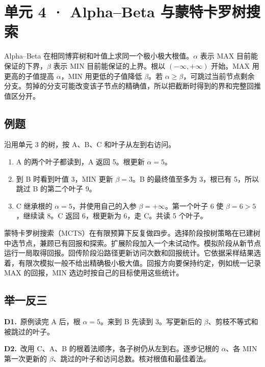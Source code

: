 \documentclass[UTF8,a4paper,11pt]{ctexart}
\newcommand{\CompactQuestion}[2]{\par\noindent\textbf{#1.}\ #2\par\vspace{.8em}}
\begin{document}
\section{单元 4 · Alpha–Beta 与蒙特卡罗树搜索}
Alpha–Beta 在相同博弈树和叶值上求同一个极小极大根值。$\alpha$ 表示 MAX 目前能保证的下界，$\beta$ 表示 MIN 目前能保证的上界。根以 $(-\infty,+\infty)$ 开始。MAX 用更高的子值提高 $\alpha$，MIN 用更低的子值降低 $\beta$。若 $\alpha\ge\beta$，可跳过当前节点剩余分支。剪掉的分支可能改变该子节点的精确值，所以把截断时得到的界和完整回推值区分开。

\subsection{例题}
沿用单元 3 的树，按 A、B、C 和叶子从左到右访问。

\begin{enumerate}
\item A 的两个叶子都读到，A 返回 5。根更新 $\alpha=5$。
\item 到 B 时看到叶值 3，MIN 更新 $\beta=3$。B 的最终值至多为 3，根已有 5，所以跳过 B 的第二个叶子 9。
\item C 继承根的 $\alpha=5$，并使用自己的入参 $\beta=+\infty$。第一个叶子 6 使 $\beta=6>5$，继续读 8。C 返回 6，根更新为 6，走 C。共读 5 个叶子。
\end{enumerate}
蒙特卡罗树搜索（MCTS）在有限预算下反复做四步。选择阶段按树策略在已建树中选节点，兼顾已有回报和探索。扩展阶段加入一个未试动作。模拟阶段从新节点运行一局取得回报。回传阶段沿路径更新访问次数和回报统计。它依据采样结果选着，有限次模拟一般不给出精确极小极大值。回报方向要保持约定，例如统一记录 MAX 的回报，MIN 选边时按自己的目标使用这些统计。

\subsection{举一反三}
\CompactQuestion{D1}{原例读完 A 后，根 $\alpha=5$。来到 B 先读到 3。写更新后的 $\beta$、剪枝不等式和被跳过的叶子。}
\CompactQuestion{D2}{改用 C、A、B 的根着法顺序，各子树仍从左到右。逐步记根的 $\alpha$、各 MIN 第一次更新的 $\beta$、跳过的叶子和访问总数。核对根值和最佳着法。}
\clearpage
\end{document}
